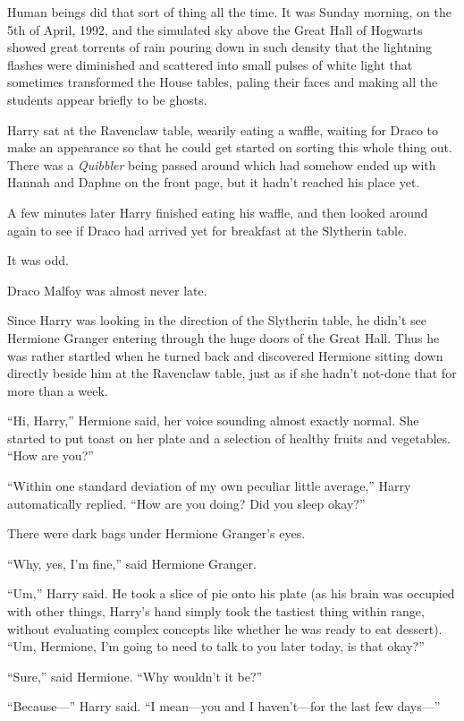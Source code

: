Human beings did that sort of thing all the time.
\later
It was Sunday morning, on the 5th of April, 1992, and the simulated sky above
the Great Hall of Hogwarts showed great torrents of rain pouring down in such
density that the lightning flashes were diminished and scattered into small
pulses of white light that sometimes transformed the House tables, paling their
faces and making all the students appear briefly to be ghosts.

Harry sat at the Ravenclaw table, wearily eating a waffle, waiting for Draco to
make an appearance so that he could get started on sorting this whole thing
out. There was a \emph{Quibbler} being passed around which had somehow ended up
with Hannah and Daphne on the front page, but it hadn’t reached his place yet.

A few minutes later Harry finished eating his waffle, and then looked around
again to see if Draco had arrived yet for breakfast at the Slytherin table.

It was odd.

Draco Malfoy was almost never late.

Since Harry was looking in the direction of the Slytherin table, he didn’t see
Hermione Granger entering through the huge doors of the Great Hall. Thus he was
rather startled when he turned back and discovered Hermione sitting down
directly beside him at the Ravenclaw table, just as if she hadn’t not-done that
for more than a week.

“Hi, Harry,” Hermione said, her voice sounding almost exactly normal. She
started to put toast on her plate and a selection of healthy fruits and
vegetables. “How are you?”

“Within one standard deviation of my own peculiar little average,” Harry
automatically replied. “How are you doing? Did you sleep okay?”

There were dark bags under Hermione Granger’s eyes.

“Why, yes, I’m fine,” said Hermione Granger.

“Um,” Harry said. He took a slice of pie onto his plate (as his brain was
occupied with other things, Harry’s hand simply took the tastiest thing within
range, without evaluating complex concepts like whether he was ready to eat
dessert). “Um, Hermione, I’m going to need to talk to you later today, is that
okay?”

“Sure,” said Hermione. “Why wouldn’t it be?”

“Because—” Harry said. “I mean—you and I haven’t—for the last few days—”

